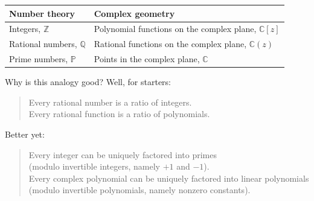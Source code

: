 \documentclass{article}
\begin{document}
\begin{longtable}[]{@{}ll@{}}
\toprule
\begin{minipage}[b]{0.42\columnwidth}\raggedright
Number theory\strut
\end{minipage} & \begin{minipage}[b]{0.52\columnwidth}\raggedright
Complex geometry\strut
\end{minipage}\tabularnewline
\midrule
\endhead
\begin{minipage}[t]{0.42\columnwidth}\raggedright
Integers, \(\mathbb{Z}\)\strut
\end{minipage} & \begin{minipage}[t]{0.52\columnwidth}\raggedright
Polynomial functions on the complex plane, \(\mathbb{C}[z]\)\strut
\end{minipage}\tabularnewline
\begin{minipage}[t]{0.42\columnwidth}\raggedright
Rational numbers, \(\mathbb{Q}\)\strut
\end{minipage} & \begin{minipage}[t]{0.52\columnwidth}\raggedright
Rational functions on the complex plane, \(\mathbb{C}(z)\)\strut
\end{minipage}\tabularnewline
\begin{minipage}[t]{0.42\columnwidth}\raggedright
Prime numbers, \(\mathbb{P}\)\strut
\end{minipage} & \begin{minipage}[t]{0.52\columnwidth}\raggedright
Points in the complex plane, \(\mathbb{C}\)\strut
\end{minipage}\tabularnewline
\bottomrule
\end{longtable}

Why is this analogy good? Well, for starters:

\begin{quote}
Every rational number is a ratio of integers.\\

Every rational function is a ratio of polynomials.
\end{quote}

Better yet:

\begin{quote}
Every integer can be uniquely factored into primes\\
(modulo invertible integers, namely \(+1\) and \(-1\)).\\

Every complex polynomial can be uniquely factored into linear
polynomials\\
(modulo invertible polynomials, namely nonzero constants).
\end{quote}
\end{document}
